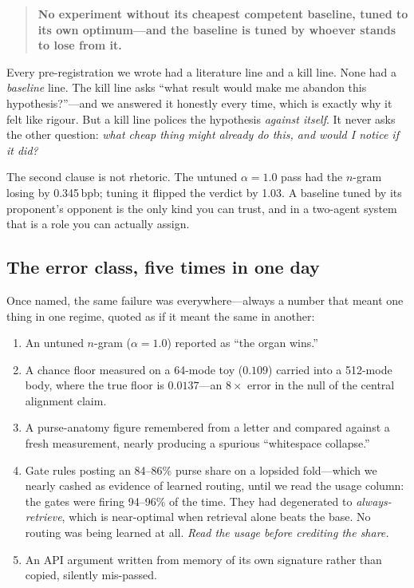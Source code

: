 \documentclass[11pt,a4paper]{article}
\newcommand{\bpb}{\,bpb}
\begin{document}
\begin{quote}
\textbf{No experiment without its cheapest competent baseline, tuned to its own
optimum---and the baseline is tuned by whoever stands to lose from it.}
\end{quote}

Every pre-registration we wrote had a literature line and a kill line. None had a
\emph{baseline} line. The kill line asks ``what result would make me abandon this
hypothesis?''---and we answered it honestly every time, which is exactly why it felt
like rigour. But a kill line polices the hypothesis \emph{against itself}. It never
asks the other question: \emph{what cheap thing might already do this, and would I
notice if it did?}

The second clause is not rhetoric. The untuned $\alpha{=}1.0$ pass had the $n$-gram
losing by 0.345\bpb; tuning it flipped the verdict by 1.03. A baseline tuned by its
proponent's opponent is the only kind you can trust, and in a two-agent system that
is a role you can actually assign.

\subsection{The error class, five times in one day}

Once named, the same failure was everywhere---always a number that meant one thing
in one regime, quoted as if it meant the same in another:

\begin{enumerate}[leftmargin=1.5em,itemsep=2pt]
\item An untuned $n$-gram ($\alpha{=}1.0$) reported as ``the organ wins.''
\item A chance floor measured on a 64-mode toy ($0.109$) carried into a 512-mode
body, where the true floor is $0.0137$---an $8\times$ error in the null of the
central alignment claim.
\item A purse-anatomy figure remembered from a letter and compared against a fresh
measurement, nearly producing a spurious ``whitespace collapse.''
\item Gate rules posting an 84--86\% purse share on a lopsided fold---which we
nearly cashed as evidence of learned routing, until we read the usage column: the
gates were firing 94--96\% of the time. They had degenerated to
\emph{always-retrieve}, which is near-optimal when retrieval alone beats the base.
No routing was being learned at all. \emph{Read the usage before crediting the
share.}
\item An API argument written from memory of its own signature rather than copied,
silently mis-passed.
\end{enumerate}
\end{document}
